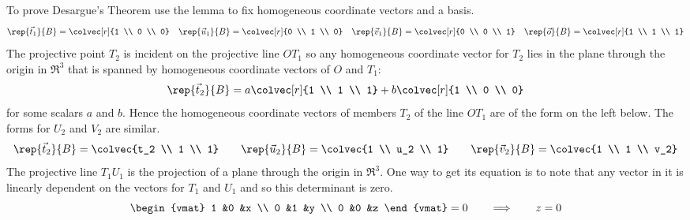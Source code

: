 To prove Desargue's Theorem use the lemma to fix homogeneous
coordinate vectors and a basis.
\begin{equation*}
  \rep{\vec{t}_1}{B}=\colvec[r]{1 \\ 0 \\ 0}
  \quad
  \rep{\vec{u}_1}{B}=\colvec[r]{0 \\ 1 \\ 0}
  \quad
  \rep{\vec{v}_1}{B}=\colvec[r]{0 \\ 0 \\ 1}
  \quad
  \rep{\vec{o}}{B}=\colvec[r]{1 \\ 1 \\ 1}    
\end{equation*}
The projective point $T_2$ is incident on the projective line $OT_1$
so any homogeneous coordinate vector for $T_2$ lies in the
plane through the origin in $\Re^3$ that is spanned by homogeneous
coordinate vectors of $O$ and $T_1$:
\begin{equation*}
  \rep{\vec{t}_2}{B}=a\colvec[r]{1 \\ 1 \\ 1}
                          +b\colvec[r]{1 \\ 0 \\ 0}
\end{equation*}
for some scalars $a$ and $b$.
Hence the homogeneous coordinate vectors of members $T_2$ of the line 
$OT_1$ are of the form on the left below. 
The forms for $U_2$ and $V_2$ are similar. 
\begin{equation*}
  \rep{\vec{t}_2}{B}=\colvec{t_2 \\ 1 \\ 1}
  \qquad
  \rep{\vec{u}_2}{B}=\colvec{1 \\ u_2 \\ 1}
  \qquad
  \rep{\vec{v}_2}{B}=\colvec{1 \\ 1 \\ v_2}
\end{equation*}
The projective line $T_1U_1$ is the projection of a plane through the 
origin in $\Re^3$.
One way to get its equation is to note that any vector in it
is linearly dependent on the vectors for $T_1$ and
$U_1$ and so this determinant is zero.
\begin{equation*}
  \begin{vmat}
    1  &0  &x  \\
    0  &1  &y  \\
    0  &0  &z
  \end{vmat}=0
  \qquad
  \Longrightarrow
  \qquad
  z=0
\end{equation*}
